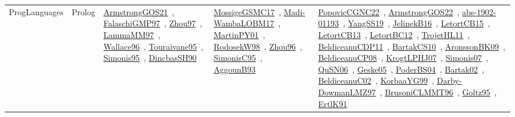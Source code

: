 {\begin{longtable}{lp{3cm}>{\raggedright\arraybackslash}p{6cm}>{\raggedright\arraybackslash}p{6cm}>{\raggedright\arraybackslash}p{8cm}}
ProgLanguages & Prolog & \href{papers/ArmstrongGOS21.pdf}{ArmstrongGOS21}~\cite{ArmstrongGOS21}, \href{articles/FalaschiGMP97.pdf}{FalaschiGMP97}~\cite{FalaschiGMP97}, \href{articles/Zhou97.pdf}{Zhou97}~\cite{Zhou97}, \href{articles/LammaMM97.pdf}{LammaMM97}~\cite{LammaMM97}, \href{articles/Wallace96.pdf}{Wallace96}~\cite{Wallace96}, \href{papers/Touraivane95.pdf}{Touraivane95}~\cite{Touraivane95}, \href{papers/Simonis95.pdf}{Simonis95}~\cite{Simonis95}, \href{articles/DincbasSH90.pdf}{DincbasSH90}~\cite{DincbasSH90} & \href{papers/MossigeGSMC17.pdf}{MossigeGSMC17}~\cite{MossigeGSMC17}, \href{papers/Madi-WambaLOBM17.pdf}{Madi-WambaLOBM17}~\cite{Madi-WambaLOBM17}, \href{articles/MartinPY01.pdf}{MartinPY01}~\cite{MartinPY01}, \href{papers/RodosekW98.pdf}{RodosekW98}~\cite{RodosekW98}, \href{papers/Zhou96.pdf}{Zhou96}~\cite{Zhou96}, \href{papers/SimonisC95.pdf}{SimonisC95}~\cite{SimonisC95}, \href{articles/AggounB93.pdf}{AggounB93}~\cite{AggounB93} & \href{papers/PopovicCGNC22.pdf}{PopovicCGNC22}~\cite{PopovicCGNC22}, \href{papers/ArmstrongGOS22.pdf}{ArmstrongGOS22}~\cite{ArmstrongGOS22}, \href{articles/abs-1902-01193.pdf}{abs-1902-01193}~\cite{abs-1902-01193}, \href{papers/YangSS19.pdf}{YangSS19}~\cite{YangSS19}, \href{papers/JelinekB16.pdf}{JelinekB16}~\cite{JelinekB16}, \href{articles/LetortCB15.pdf}{LetortCB15}~\cite{LetortCB15}, \href{papers/LetortCB13.pdf}{LetortCB13}~\cite{LetortCB13}, \href{papers/LetortBC12.pdf}{LetortBC12}~\cite{LetortBC12}, \href{articles/TrojetHL11.pdf}{TrojetHL11}~\cite{TrojetHL11}, \href{articles/BeldiceanuCDP11.pdf}{BeldiceanuCDP11}~\cite{BeldiceanuCDP11}, \href{articles/BartakCS10.pdf}{BartakCS10}~\cite{BartakCS10}, \href{papers/AronssonBK09.pdf}{AronssonBK09}~\cite{AronssonBK09}, \href{papers/BeldiceanuCP08.pdf}{BeldiceanuCP08}~\cite{BeldiceanuCP08}, \href{papers/KrogtLPHJ07.pdf}{KrogtLPHJ07}~\cite{KrogtLPHJ07}, \href{articles/Simonis07.pdf}{Simonis07}~\cite{Simonis07}, \href{papers/QuSN06.pdf}{QuSN06}~\cite{QuSN06}, \href{papers/Geske05.pdf}{Geske05}~\cite{Geske05}, \href{articles/PoderBS04.pdf}{PoderBS04}~\cite{PoderBS04}, \href{papers/Bartak02.pdf}{Bartak02}~\cite{Bartak02}, \href{papers/BeldiceanuC02.pdf}{BeldiceanuC02}~\cite{BeldiceanuC02}, \href{papers/KorbaaYG99.pdf}{KorbaaYG99}~\cite{KorbaaYG99}, \href{articles/Darby-DowmanLMZ97.pdf}{Darby-DowmanLMZ97}~\cite{Darby-DowmanLMZ97}, \href{papers/BrusoniCLMMT96.pdf}{BrusoniCLMMT96}~\cite{BrusoniCLMMT96}, \href{papers/Goltz95.pdf}{Goltz95}~\cite{Goltz95}, \href{papers/ErtlK91.pdf}{ErtlK91}~\cite{ErtlK91}\\

\end{longtable}}
